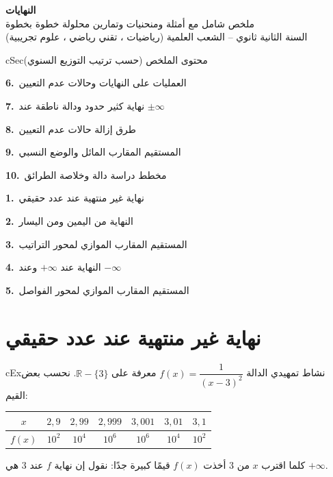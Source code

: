 \documentclass[12pt,a4paper]{article}
\newenvironment{BOX}[2]{\begin{otherlanguage}{english}\begin{arbox}{#1}{#2}}{\end{arbox}\end{otherlanguage}}
\newenvironment{mithal}[1][مثال]{\begin{BOX}{cEx}{#1}}{\end{BOX}}
\newenvironment{LTR}{\begin{otherlanguage}{english}}{\end{otherlanguage}}
\newcommand{\R}{\mathbb{R}}
\newcommand{\TwoCol}[4]{\par\begin{LTR}\noindent\begin{minipage}[t]{#1\textwidth}\selectlanguage{arabic}#2\end{minipage}\hfill\begin{minipage}[t]{#3\textwidth}\selectlanguage{arabic}#4\end{minipage}\end{LTR}\par}
\newcommand{\RL}[4]{\TwoCol{#3}{#4}{#1}{#2}}  %
\begin{document}
\begin{LTR}
\begin{tcolorbox}[enhanced,colback=cSec!10,colframe=cSec!40,arc=3mm,halign=center,boxrule=0.6pt,top=12pt,bottom=12pt,before upper={\selectlanguage{arabic}}]
{\color{cSec}\fontsize{28}{34}\selectfont\bfseries النهايات}\\[8pt]
{\color{cSec!80!black}\large ملخص شامل مع أمثلة ومنحنيات وتمارين محلولة خطوة بخطوة}\\[5pt]
{\color{cSec!80!black}\large السنة الثانية ثانوي -- الشعب العلمية (رياضيات ، تقني رياضي ، علوم تجريبية)}
\end{tcolorbox}
\end{LTR}

\begin{BOX}{cSec}{محتوى الملخص (حسب ترتيب التوزيع السنوي)}
\RL{0.48}{\textbf{1.}\ نهاية غير منتهية عند عدد حقيقي\par \textbf{2.}\ النهاية من اليمين ومن اليسار\par \textbf{3.}\ المستقيم المقارب الموازي لمحور التراتيب\par \textbf{4.}\ النهاية عند $+\infty$ وعند $-\infty$\par \textbf{5.}\ المستقيم المقارب الموازي لمحور الفواصل}{0.48}{\textbf{6.}\ العمليات على النهايات وحالات عدم التعيين\par \textbf{7.}\ نهاية كثير حدود ودالة ناطقة عند $\pm\infty$\par \textbf{8.}\ طرق إزالة حالات عدم التعيين\par \textbf{9.}\ المستقيم المقارب المائل والوضع النسبي\par \textbf{10.}\ مخطط دراسة دالة وخلاصة الطرائق}
\end{BOX}

\section{نهاية غير منتهية عند عدد حقيقي}
\begin{mithal}[نشاط تمهيدي]
الدالة $f(x)=\dfrac1{(x-3)^2}$ معرفة على $\R-\{3\}$. نحسب بعض القيم:
\begin{center}
\begin{LTR}\renewcommand{\arraystretch}{1.5}
\begin{tabular}{|c|c|c|c|c|c|c|}\hline
\rowcolor{cSec!12}$x$ & $2{,}9$ & $2{,}99$ & $2{,}999$ & $3{,}001$ & $3{,}01$ & $3{,}1$\\\hline
$f(x)$ & $10^2$ & $10^4$ & $10^6$ & $10^6$ & $10^4$ & $10^2$\\\hline
\end{tabular}\end{LTR}
\end{center}
كلما اقترب $x$ من $3$ أخذت $f(x)$ قيمًا كبيرة جدًا: نقول إن نهاية $f$ عند $3$ هي $+\infty$.
\end{mithal}
\end{document}
